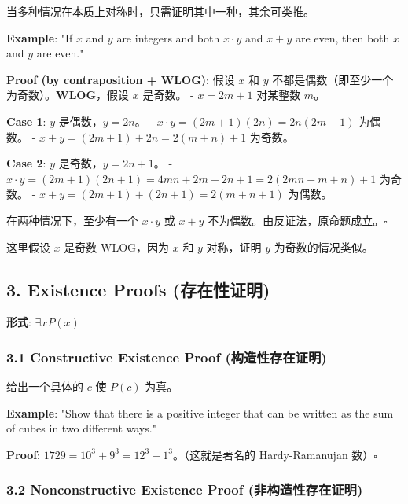 \documentclass[10pt,a4paper,openany]{ctexbook}
\theoremstyle{definition}
\theoremstyle{remark}
\renewenvironment{quote}
  {\list{}{\leftmargin=1em\rightmargin=0pt\topsep=0.5pt\partopsep=0pt}\item[]}
  {\endlist}
\begin{document}
\begin{quote}
当多种情况在本质上对称时，只需证明其中一种，其余可类推。

\textbf{Example}: "If $x$ and $y$ are integers and both $x \cdot y$ and $x + y$ are even, then both $x$ and $y$ are even."

\textbf{Proof (by contraposition + WLOG)}:
假设 $x$ 和 $y$ 不都是偶数（即至少一个为奇数）。\textbf{WLOG}，假设 $x$ 是奇数。
- $x = 2m + 1$ 对某整数 $m$。

\textbf{Case 1}: $y$ 是偶数，$y = 2n$。
- $x \cdot y = (2m+1)(2n) = 2n(2m+1)$ 为偶数。
- $x + y = (2m+1) + 2n = 2(m+n) + 1$ 为奇数。

\textbf{Case 2}: $y$ 是奇数，$y = 2n + 1$。
- $x \cdot y = (2m+1)(2n+1) = 4mn + 2m + 2n + 1 = 2(2mn+m+n) + 1$ 为奇数。
- $x + y = (2m+1) + (2n+1) = 2(m+n+1)$ 为偶数。

在两种情况下，至少有一个 $x \cdot y$ 或 $x + y$ 不为偶数。由反证法，原命题成立。$\square$

这里假设 $x$ 是奇数 WLOG，因为 $x$ 和 $y$ 对称，证明 $y$ 为奇数的情况类似。

\end{quote}
\vspace{-2pt}

\subsection{3. Existence Proofs (存在性证明)}

\textbf{形式}: $\exists x P(x)$
\subsubsection{3.1 Constructive Existence Proof (构造性存在证明)}

\begin{quote}
给出一个具体的 $c$ 使 $P(c)$ 为真。

\textbf{Example}: "Show that there is a positive integer that can be written as the sum of cubes in two different ways."

\textbf{Proof}: $1729 = 10^3 + 9^3 = 12^3 + 1^3$。（这就是著名的 Hardy-Ramanujan 数）$\square$

\end{quote}

\subsubsection{3.2 Nonconstructive Existence Proof (非构造性存在证明)}
\end{document}
